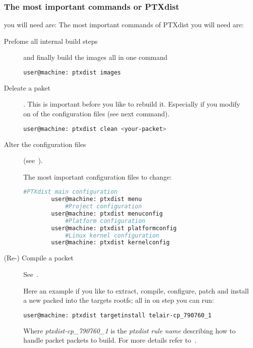     \subsubsection{The most important commands or PTXdist} you will need are:
    The most important commands of PTXdist you will need are:
\begin{description} \item[Prefome all internal build steps] and finally build
    the images all in one command
    \begin{lstlisting}[language=bash,numbers=none,caption=Build all images with
    PTXdist]
        user@machine: ptxdist images
        \end{lstlisting}
    \item[Deleate a paket]. This is important before you like to rebuild it.
        Especially if you modify on of the configuration files (see next
        command).

        \begin{lstlisting}[language=bash,numbers=none,caption=Deleat a
        builded packet from PTXdsits scope]
        user@machine: ptxdist clean <your-packet>
        \end{lstlisting}
\newpage
    \item[Alter the configuration files] (see~\cite[PTXdist user
        manual]{ptxdist_manual}).

        The most important configuration files to change:

        \lstset{style=bash}
        \begin{lstlisting}[language=bash,numbers=none,caption=Alter a
        configuration]
            #PTXdist main configuration
        user@machine: ptxdist menu
            #Project configuration
        user@machine: ptxdist menuconfig
            #Platform configuration
        user@machine: ptxdist platformconfig
            #Linux kernel configuration
        user@machine: ptxdist kernelconfig
        \end{lstlisting}
    \item[(Re-) Compile a packet] See~\cite[PTXdist’s build
        process]{ptxdist_manual}.

        Here an example if you like to extract, compile, configure, patch and
        install a new packed into the targets \gls{rootfs}; all in on step you
        can run:

        \begin{lstlisting}[language=bash,numbers=none,caption=Compile and
        install a paket with PTXdist]
        user@machine: ptxdist targetinstall telair-cp_790760_1
        \end{lstlisting}

        Where \textit{ptxdist-cp\_790760\_1} is the \textit{ptxdist rule name}
        describing how to handle packet packets to build. For more details refer
        to~\cite[PTXdist development guide]{ptxdist_developer}.
\end{description}

